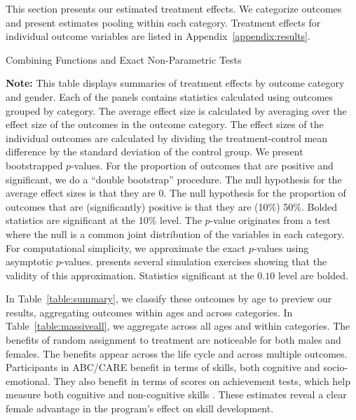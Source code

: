 This section presents our estimated treatment effects. We categorize outcomes and present estimates pooling within each category. Treatment effects for individual outcome variables are listed in Appendix~\ref{appendix:results}.

\begin{table}[!htpb]
\begin{threeparttable}
\caption{Combining Functions and Exact Non-Parametric Tests} \label{table:massiveall}
\centering

\begin{tablenotes}
\scriptsize
\item \textbf{Note:} This table displays summaries of treatment effects by outcome category and gender. Each of the panels contains statistics calculated using outcomes grouped by category. The average effect size is calculated by averaging over the effect size of the outcomes in the outcome category. The effect sizes of the individual outcomes are calculated by dividing the treatment-control mean difference by the standard deviation of the control group. We present bootstrapped $p$-values. For the proportion of outcomes that are positive and significant, we do a ``double bootstrap'' procedure. The null hypothesis for the average effect sizes is that they are 0. The null hypothesis for the proportion of outcomes that are (significantly) positive is that they are (10\%) 50\%. Bolded statistics are significant at the 10\% level. The \citet{Rosenbaum_2005_Distribution_JRSS} $p$-value originates from a test where the null is a common joint distribution of the variables in each category. For computational simplicity, we approximate the exact $p$-values using asymptotic $p$-values. \citet{Rosenbaum_2005_Distribution_JRSS} presents several simulation exercises showing that the validity of this approximation. Statistics significant at the $0.10$ level are bolded.
\end{tablenotes}
\end{threeparttable}
\end{table}

In Table~\ref{table:summary}, we classify these outcomes by age to preview our results, aggregating outcomes within ages and across categories. In Table~\ref{table:massiveall}, we aggregate across all ages and within categories. The benefits of random assignment to treatment are noticeable for both males and females. The benefits appear across the life cycle and across multiple outcomes. Participants in ABC/CARE benefit in terms of skills, both cognitive and socio-emotional. They also benefit in terms of scores on achievement tests, which help measure both cognitive and non-cognitive skills \citep{Almlund_Duckworth_etal_2011_ecoval}. These estimates reveal a clear female advantage in the program's effect on skill development.

